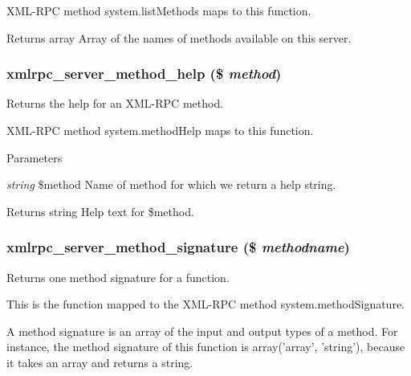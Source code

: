 XML-\/RPC method system.listMethods maps to this function.

\begin{DoxyReturn}{Returns}
array Array of the names of methods available on this server. 
\end{DoxyReturn}
\hypertarget{xmlrpcs_8inc_a1a48f047591bd1d200db7bef20d5c5eb}{
\subsubsection[{xmlrpc\_\-server\_\-method\_\-help}]{\setlength{\rightskip}{0pt plus 5cm}xmlrpc\_\-server\_\-method\_\-help (\$ {\em method})}}
\label{xmlrpcs_8inc_a1a48f047591bd1d200db7bef20d5c5eb}
Returns the help for an XML-\/RPC method.

XML-\/RPC method system.methodHelp maps to this function.


\begin{DoxyParams}{Parameters}
\item[{\em string}]\$method Name of method for which we return a help string.\end{DoxyParams}
\begin{DoxyReturn}{Returns}
string Help text for \$method. 
\end{DoxyReturn}
\hypertarget{xmlrpcs_8inc_a9b7ad314b1b3d3a70211bf6d7d30ea84}{
\subsubsection[{xmlrpc\_\-server\_\-method\_\-signature}]{\setlength{\rightskip}{0pt plus 5cm}xmlrpc\_\-server\_\-method\_\-signature (\$ {\em methodname})}}
\label{xmlrpcs_8inc_a9b7ad314b1b3d3a70211bf6d7d30ea84}
Returns one method signature for a function.

This is the function mapped to the XML-\/RPC method system.methodSignature.

A method signature is an array of the input and output types of a method. For instance, the method signature of this function is array('array', 'string'), because it takes an array and returns a string.


